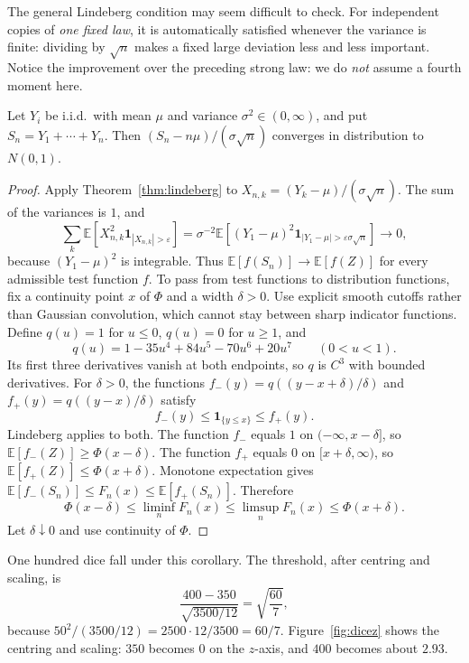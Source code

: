 The general Lindeberg condition may seem difficult to check. For independent copies of \emph{one fixed law}, it is automatically satisfied whenever the variance is finite: dividing by $\sqrt n$ makes a fixed large deviation less and less important. Notice the improvement over the preceding strong law: we do \emph{not} assume a fourth moment here.

\begin{corollary}\label{cor:clt}
Let $Y_i$ be i.i.d.\ with mean $\mu$ and variance $\sigma^2\in(0,\infty)$, and put $S_n=Y_1+\cdots+Y_n$. Then $(S_n-n\mu)/(\sigma\sqrt n)$ converges in distribution to $N(0,1)$.
\end{corollary}
\begin{proof}
Apply Theorem~\ref{thm:lindeberg} to $X_{n,k}=(Y_k-\mu)/(\sigma\sqrt n)$. The sum of the variances is $1$, and
\[
\sum_k\mathbb E[X_{n,k}^2\mathbf 1_{|X_{n,k}|>\varepsilon}]
=\sigma^{-2}\mathbb E[(Y_1-\mu)^2\mathbf 1_{|Y_1-\mu|>\varepsilon\sigma\sqrt n}]\to0,
\]
because $(Y_1-\mu)^2$ is integrable. Thus $\mathbb E[f(S_n)]\to\mathbb E[f(Z)]$ for every admissible test function $f$. To pass from test functions to distribution functions, fix a continuity point $x$ of $\Phi$ and a width $\delta>0$. Use explicit smooth cutoffs rather than Gaussian convolution, which cannot stay between sharp indicator functions. Define $q(u)=1$ for $u\le0$, $q(u)=0$ for $u\ge1$, and
\[
q(u)=1-35u^4+84u^5-70u^6+20u^7\qquad(0<u<1).
\]
Its first three derivatives vanish at both endpoints, so $q$ is $C^3$ with bounded derivatives. For $\delta>0$, the functions $f_-(y)=q((y-x+\delta)/\delta)$ and $f_+(y)=q((y-x)/\delta)$ satisfy
\[
f_-(y)\le\mathbf1_{\{y\le x\}}\le f_+(y).
\]
Lindeberg applies to both. The function $f_-$ equals $1$ on $(-\infty,x-\delta]$, so $\mathbb E[f_-(Z)]\ge\Phi(x-\delta)$. The function $f_+$ equals $0$ on $[x+\delta,\infty)$, so $\mathbb E[f_+(Z)]\le\Phi(x+\delta)$. Monotone expectation gives $\mathbb E[f_-(S_n)]\le F_n(x)\le\mathbb E[f_+(S_n)]$. Therefore
\[
\Phi(x-\delta)\le\liminf_nF_n(x)\le\limsup_nF_n(x)\le\Phi(x+\delta).
\]
Let $\delta\downarrow0$ and use continuity of $\Phi$.
\end{proof}

One hundred dice fall under this corollary. The threshold, after centring and scaling, is
\[
 \frac{400-350}{\sqrt{3500/12}}=\sqrt{\frac{60}7},
\]
because $50^2/(3500/12)=2500\cdot12/3500=60/7$. Figure~\ref{fig:dicez} shows the centring and scaling: $350$ becomes $0$ on the $z$-axis, and $400$ becomes about $2.93$.

